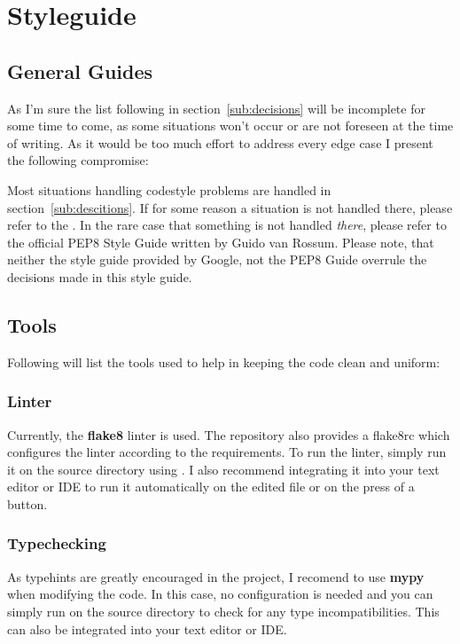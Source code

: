 \section{Styleguide}

\subsection{General Guides}
As I'm sure the list following in section~\ref{sub:decisions} will be
incomplete for some time to come, as some situations won't occur or are not
foreseen at the time of writing. As it would be too much effort to address
every edge case I present the following compromise:

Most situations handling codestyle problems are handled in
section~\ref{sub:descitions}. If for some reason a situation is not handled
there, please refer to the \RefGoogleStyle{}.  In the rare case that something
is not handled \emph{there}, please refer to the official PEP8 Style Guide
written by Guido van Rossum.  Please note, that neither the style guide
provided by Google, not the PEP8 Guide overrule the decisions made in this
style guide.

\subsection{Tools}
Following will list the tools used to help in keeping the code clean
and uniform:

\subsubsection{Linter}
Currently, the \textbf{flake8} linter is used. The repository also provides a
flake8rc which configures the linter according to the requirements. To run the
linter, simply run it on the source directory using . I also
recommend integrating it into your text editor or IDE to run it automatically
on the edited file or on the press of a button. 

\subsubsection{Typechecking}
As typehints are greatly encouraged in the project, I recomend to
use \textbf{mypy} when modifying the code. In this case, no configuration is
needed and you can simply run  on the source directory to check
for any type incompatibilities. This can also be integrated into your
text editor or IDE.

